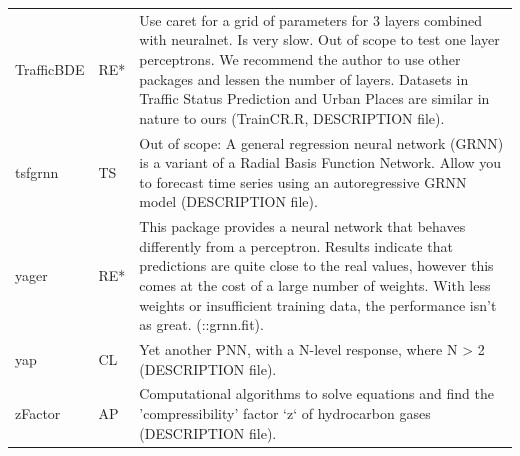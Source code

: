 \begin{Schunk}
\begin{longtable}[t]{ll>{\raggedright\arraybackslash}p{10cm}}
TrafficBDE & RE* & Use caret for a grid of parameters for 3 layers combined with neuralnet. Is very slow. Out of scope to test one layer perceptrons. We recommend the author to use other packages and lessen the number of layers. Datasets in Traffic Status Prediction and Urban Places are similar in nature to ours (TrainCR.R, DESCRIPTION file).\\
tsfgrnn & TS & Out of scope: A general regression neural network (GRNN) is a variant of a Radial Basis Function Network. Allow you to forecast time series using an autoregressive GRNN model (DESCRIPTION file).\\
\addlinespace
yager & RE* & This package provides a neural network that behaves differently from a perceptron. Results indicate that predictions are quite close to the real values, however this comes at the cost of a large number of weights. With less weights or insufficient training data, the performance isn't as great. (::grnn.fit).\\
yap & CL & Yet another PNN, with a N-level response, where N > 2 (DESCRIPTION file).\\
zFactor & AP & Computational algorithms to solve equations and find the 'compressibility' factor `z` of hydrocarbon gases (DESCRIPTION file).\\*
\end{longtable}
\endgroup{}

\end{Schunk}


\address{%
Salsabila Mahdi\\
Universitas Syiah Kuala\\%
JL. Syech Abdurrauf No.3, Aceh 23111, Indonesia\\
%
%
\\\textit{ORCiD: \href{https://orcid.org/0000-0002-2559-4154}{0000-0002-2559-4154}}%
\\\href{mailto:bila.mahdi@mhs.unsyiah.ac.id}{\nolinkurl{bila.mahdi@mhs.unsyiah.ac.id}}
}

\address{%
Akshaj Verma\\
Manipal Institute of Technology\\%
Manipal, Karnataka, 576104, India\\
%
%
\\\textit{ORCiD: \href{https://orcid.org/0000-0002-3936-0033}{0000-0002-3936-0033}}%
\\\href{mailto:akshajverma7@gmail.com}{\nolinkurl{akshajverma7@gmail.com}}
}

\address{%
Christophe Dutang\\
Université Paris-Dauphine, University PSL, CNRS, CEREMADE\\%
Place du Maréchal de Lattre de Tassigny, 75016 Paris, France\\
%
%
\\\textit{ORCiD: \href{https://orcid.org/0000-0001-6732-1501}{0000-0001-6732-1501}}%
\\\href{mailto:dutang@ceremade.dauphine.fr}{\nolinkurl{dutang@ceremade.dauphine.fr}}
}

